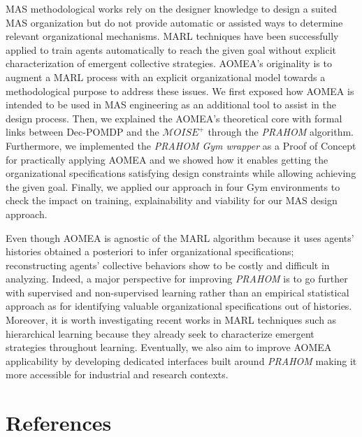 \documentclass[runningheads]{llncs}
\begin{document}

MAS methodological works rely on the designer knowledge to design a suited MAS organization but do not provide automatic or assisted ways to determine relevant organizational mechanisms.
MARL techniques have been successfully applied to train agents automatically to reach the given goal without explicit characterization of emergent collective strategies.
AOMEA's originality is to augment a MARL process with an explicit organizational model towards a methodological purpose to address these issues. We first exposed how AOMEA is intended to be used in MAS engineering as an additional tool to assist in the design process.
Then, we explained the AOMEA's theoretical core with formal links between Dec-POMDP and the $\mathcal{M}OISE^+$ through the \emph{PRAHOM} algorithm.
Furthermore, we implemented the \emph{PRAHOM Gym wrapper} as a Proof of Concept for practically applying AOMEA and we showed how it enables getting the organizational specifications satisfying design constraints while allowing achieving the given goal.
Finally, we applied our approach in four Gym environments to check the impact on training, explainability and viability for our MAS design approach.

Even though AOMEA is agnostic of the MARL algorithm because it uses agents' histories obtained a posteriori to infer organizational specifications; reconstructing agents' collective behaviors show to be costly and difficult in analyzing. Indeed, a major perspective for improving \emph{PRAHOM} is to go further with supervised and non-supervised learning rather than an empirical statistical approach as for identifying valuable organizational specifications out of histories. Moreover, it is worth investigating recent works in MARL techniques such as hierarchical learning because they already seek to characterize emergent strategies throughout learning.
Eventually, we also aim to improve AOMEA applicability by developing dedicated interfaces built around \emph{PRAHOM} making it more accessible for industrial and research contexts.


%
%
% 
% 
%
\section*{References}


% 


\end{document}
